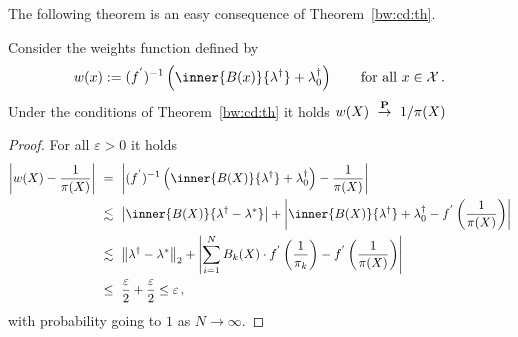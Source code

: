 The following theorem is an easy consequence of Theorem~\ref{bw:cd:th}.
\begin{ftheorem}
  Consider the weights function defined by
  \begin{gather}
    w(x)
    :=
    (
    f^{'}
    )^{-1}
    \left( 
      \inner{B(x)}{\lambda^\dagger}
      +
      \lambda_0^\dagger
    \right)
    \qquad
    \text{for all}\ 
    x\in\mathcal{X}
    \,.
  \end{gather}
  Under the conditions of Theorem~\ref{bw:cd:th} 
  it holds
  $w(X)\ 
  \overset{\P}{\to}
  \ 
  1/\pi(X)
  $
\end{ftheorem}
\begin{proof}
  For all $\varepsilon>0$ it holds
\begin{align}
  \begin{split}
  \left| 
  w(X)
  -
  \frac{1}{\pi(X)}
  \right|
  &
  \ 
  =
  \ 
  \left| 
  (f^{'})^{-1}
  \left( 
    \inner{B(X)}
    {\lambda^\dagger}
    +
    \lambda_0^\dagger
  \right)
  -
  \frac{1}{\pi(X)}
  \right|
  \\
  &
  \ 
  \lesssim
  \ 
  \left| 
  \inner
  {B(X)}
  {\lambda^\dagger-\lambda^*}
  \right|
  +
  \left| 
    \inner{B(X)}
    {\lambda^\dagger}
    +
    \lambda_0^\dagger
    -
    f^{'}
    \left( 
  \frac{1}{\pi(X)}
    \right)
  \right|
  \\
  &
  \ 
  \lesssim
  \ 
  \norm{\lambda^\dagger-\lambda^*}_2
  +
  \left| 
  \sum_{i=1}^{N} 
  B_k(X)
  \cdot
    f^{'}
    \left( 
  \frac{1}{\pi_k}
    \right)
    -
    f^{'}
    \left( 
  \frac{1}{\pi(X)}
    \right)
  \right|
  \\
  &
  \ 
  \le
  \ 
  \frac{\varepsilon}{2}
+
  \frac{\varepsilon}{2}
  \le
  \varepsilon
  \,,
\end{split}
\end{align}
with probability going to $1$ as $N\to\infty$.
\end{proof}
